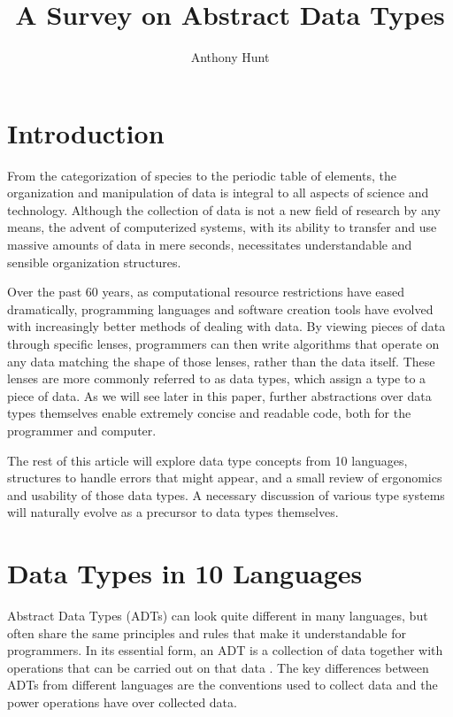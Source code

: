\documentclass{article}
\title{A Survey on Abstract Data Types}
\author{Anthony Hunt}
\begin{document}
\maketitle
\tableofcontents

\section{Introduction}

From the categorization of species to the periodic table of elements, the organization and manipulation
of data is integral to all aspects of science and technology. Although the collection of data is not a
new field of research by any means, the advent of computerized systems, with its ability to transfer and use
massive amounts of data in mere seconds, necessitates understandable and sensible organization structures.

Over the past 60 years, as computational resource restrictions have eased dramatically,
programming languages and software creation tools have evolved with increasingly better methods of dealing with data.
By viewing pieces of data through specific lenses, programmers can then write algorithms that operate on
any data matching the shape of those lenses, rather than the data itself. These lenses are more commonly referred to as
data types, which assign a type to a piece of data. As we will see later in this paper,
further abstractions over data types themselves enable extremely concise and readable code,
both for the programmer and computer.

The rest of this article will explore data type concepts from 10 languages, %
structures to handle errors that might appear, and a small review of ergonomics and usability of those data types.
A necessary discussion of various type systems will naturally evolve as a precursor to data types themselves.

\section{Data Types in 10 Languages} %

Abstract Data Types (ADTs) can look quite different in many languages, but often share the same principles and rules
that make it understandable for programmers. In its essential form, an ADT is a collection of data together with
operations that can be carried out on that data \cite{ADTspec}. The key differences between ADTs from different languages
are the conventions used to collect data and the power operations have over collected data.
\end{document}
